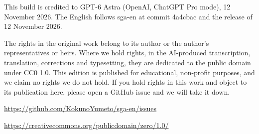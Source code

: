 This build is credited to GPT-6 Astra (OpenAI, ChatGPT Pro mode), 12 November 2026. The English follows sga-en at commit 4a4cbac and the release of 12 November 2026.\par\medskip
The rights in the original work belong to its author or the author's representatives or heirs. Where we hold rights, in the AI-produced transcription, translation, corrections and typesetting, they are dedicated to the public domain under CC0 1.0. This edition is published for educational, non-profit purposes, and we claim no rights we do not hold. If you hold rights in this work and object to its publication here, please open a GitHub issue and we will take it down.\par
\medskip\noindent\url{https://github.com/KokunoYumeto/sga-en/issues}
\par\noindent\url{https://creativecommons.org/publicdomain/zero/1.0/}
\par\endgroup\clearpage

